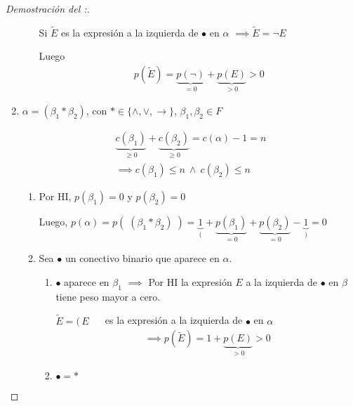 \begin{proof}[Demostración del :]
\begin{enumerate}
\begin{enumerate}
                Si $\widetilde{E}$ es la expresión a la izquierda de $\bullet$ en
                $\alpha$ $\implies \widetilde{E} = \neg E$

                Luego
                \begin{gather*}
                    p(\widetilde{E}) = \underbrace{p(\neg)}_{=0} + 
                    \underbrace{p(E)}_{>0} > 0
                \end{gather*}
            \end{enumerate}
            

        \item $\alpha = ( \beta_1 * \beta_2)$, con 
            $* \in \{ \wedge, \vee, \to \}$, $\beta_1, \beta_2 \in F$

            \begin{gather*}
                \underbrace{c(\beta_1)}_{\geq 0} +
                \underbrace{c(\beta_2)}_{\geq 0} = c(\alpha) - 1 = n \\
                \implies c(\beta_1) \leq n ~ \wedge ~ c(\beta_2) \leq n
            \end{gather*}


            \begin{enumerate}
            \item Por HI, $p(\beta_1) = 0$ y $p(\beta_2) = 0$

            Luego, $p(\alpha) = p(\; (\beta_1 * \beta_2) \;)
            = \underbrace{1}_{(} 
            + \underbrace{p(\beta_1)}_{=0} 
            + \underbrace{p(\beta_2)}_{=0} 
            - \underbrace{1}_{)} = 0$

            \item Sea $\bullet$ un conectivo binario que aparece en $\alpha$.
            \begin{enumerate}
            \item $\bullet$ aparece en $\beta_1$ $\implies$ Por HI la 
                expresión $E$ a la izquierda de $\bullet$ en $\beta$ tiene
                peso mayor a cero.

                $\widetilde{E} = ( \, E$ $\quad$
                es la expresión a la izquierda de $\bullet$ en $\alpha$
                \begin{gather*}
                    \implies p(\widetilde{E}) = 1 + \underbrace{p(E)}_{>0}>0 
                \end{gather*}

            \item $\bullet = *$


\end{enumerate}
\end{enumerate}
\end{enumerate}
\end{proof}
